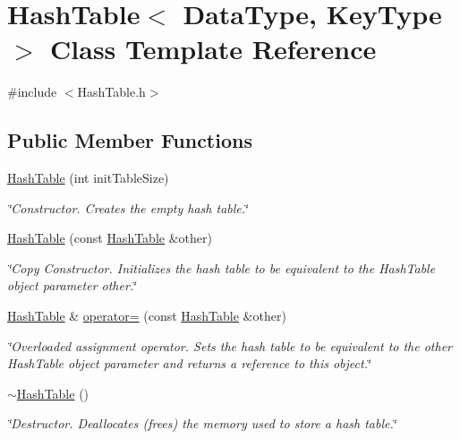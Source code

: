 \hypertarget{class_hash_table}{}\section{Hash\+Table$<$ Data\+Type, Key\+Type $>$ Class Template Reference}
\label{class_hash_table}


{\ttfamily \#include $<$Hash\+Table.\+h$>$}

\subsection*{Public Member Functions}
\begin{DoxyCompactItemize}
\item 
\hyperlink{class_hash_table_a103b09f30dbac0fe92fc2f1192feb0c1}{Hash\+Table} (int init\+Table\+Size)
\begin{DoxyCompactList}\small\item\em \char`\"{}\+Constructor. Creates the empty hash table.\char`\"{} \end{DoxyCompactList}\item 
\hyperlink{class_hash_table_a5da00f8a0dc9dc745675a96eac228049}{Hash\+Table} (const \hyperlink{class_hash_table}{Hash\+Table} \&other)
\begin{DoxyCompactList}\small\item\em \char`\"{}\+Copy Constructor. Initializes the hash table to be equivalent to the Hash\+Table object parameter other.\char`\"{} \end{DoxyCompactList}\item 
\hyperlink{class_hash_table}{Hash\+Table} \& \hyperlink{class_hash_table_add76a73a92b81a2d54c20078d4a76546}{operator=} (const \hyperlink{class_hash_table}{Hash\+Table} \&other)
\begin{DoxyCompactList}\small\item\em \char`\"{}\+Overloaded assignment operator. Sets the hash table to be equivalent to the other Hash\+Table object parameter and returns a reference to this object.\char`\"{} \end{DoxyCompactList}\item 
\hyperlink{class_hash_table_ae25eb9c66b9bce8c9c04f18e22688a15}{$\sim$\+Hash\+Table} ()
\begin{DoxyCompactList}\small\item\em \char`\"{}\+Destructor. Deallocates (frees) the memory used to store a hash table.\char`\"{} \end{DoxyCompactList}\item 

\end{DoxyCompactItemize}
